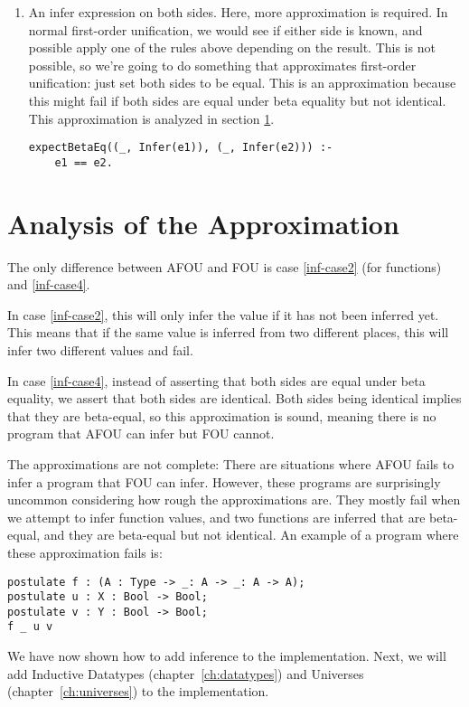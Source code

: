 \begin{enumerate}
	\item \label{inf-case4} An infer expression on both sides. Here, more approximation is required. In normal first-order unification, we would see if either side is known, and possible apply one of the rules above depending on the result. This is not possible, so we're going to do something that approximates first-order unification: just set both sides to be equal. This is an approximation because this might fail if both sides are equal under beta equality but not identical. This approximation is analyzed in section \ref{analysing-inference}.
\begin{lstlisting}
expectBetaEq((_, Infer(e1)), (_, Infer(e2))) :-
	e1 == e2.
\end{lstlisting}
	
\end{enumerate}

\section{Analysis of the Approximation}
\label{analysing-inference}

The only difference between AFOU and FOU is case \ref{inf-case2} (for functions) and \ref{inf-case4}. 

In case \ref{inf-case2}, this will only infer the value if it has not been inferred yet. This means that if the same value is inferred from two different places, this will infer two different values and fail.

In case \ref{inf-case4}, instead of asserting that both sides are equal under beta equality, we assert that both sides are identical. Both sides being identical implies that they are beta-equal, so this approximation is sound, meaning there is no program that AFOU can infer but FOU cannot. 

The approximations are not complete: There are situations where AFOU fails to infer a program that FOU can infer. However, these programs are surprisingly uncommon considering how rough the approximations are. They mostly fail when we attempt to infer function values, and two functions are inferred that are beta-equal, and they are beta-equal but not identical. An example of a program where these approximation fails is:

\begin{lstlisting}
postulate f : (A : Type -> _: A -> _: A -> A);
postulate u : X : Bool -> Bool;
postulate v : Y : Bool -> Bool;
f _ u v
\end{lstlisting}


We have now shown how to add inference to the implementation. Next, we will add Inductive Datatypes (chapter~\ref{ch:datatypes}) and Universes (chapter~\ref{ch:universes}) to the implementation.

